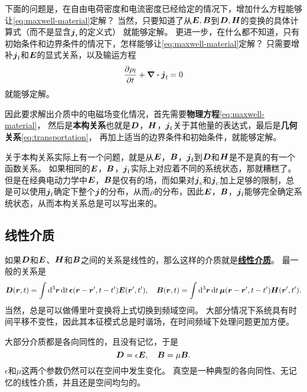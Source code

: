 \documentclass[UTF8, a4paper]{ctexart}
\renewcommand{\emph}[1]{\textbf{#1}}
\newcommand*{\concept}[1]{\underline{\textbf{#1}}}
\begin{document}
下面的问题是，在自由电荷密度和电流密度已经给定的情况下，增加什么方程能够让\eqref{eq:maxwell-material}定解？
当然，只要知道了从$\vb*{E}, \vb*{B}$到$\vb*{D}, \vb*{H}$的变换的具体计算式（而不是显含$\vb*{j}_\text{r}$的定义式）
就能够定解。
更进一步，在什么都不知道，只有初始条件和边界条件的情况下，怎样能够让\eqref{eq:maxwell-material}定解？
只需要增补$\vb*{j}_\text{f}$和$\vb*{E}$的显式关系，以及输运方程
\begin{equation}
    \pdv{\rho_\text{f}}{t} + \div{\vb*{j}_\text{f}} = 0
    \label{eq:transportation}
\end{equation}
就能够定解。

因此要求解出介质中的电磁场变化情况，首先需要\emph{物理方程}\eqref{eq:maxwell-material}，
然后是\emph{本构关系}也就是$\vb*{D}$，$\vb*{H}$，$\vb*{j}_\text{f}$关于其他量的表达式，最后是\emph{几何关系}\eqref{eq:transportation}，
再加上适当的边界条件和初始条件，就能够定解。

关于本构关系实际上有一个问题，就是从$\vb*{E}$，$\vb*{B}$，$\vb*{j}_\text{f}$到$\vb*{D}$和$\vb*{H}$是不是真的有一个函数关系。
如果相同的$\vb*{E}$，$\vb*{B}$，$\vb*{j}_\text{f}$实际上对应着不同的系统状态，那就糟糕了。
但是在经典电动力学中$\vb*{E}$，$\vb*{B}$是仅有的场，而如果对$\vb*{j}_\text{s}$和$\vb*{j}_\text{c}$加上足够的限制，总是可以使用$\vb*{j}_\text{f}$确定下整个$\vb*{j}$的分布，从而$\rho$的分布，因此$\vb*{E}$，$\vb*{B}$，$\vb*{j}_\text{f}$能够完全确定系统状态，从而本构关系总是可以写出来的。

\subsection{线性介质}

如果$\vb*{D}$和$\vb*{E}$、$\vb*{H}$和$\vb*{B}$之间的关系是线性的，那么这样的介质就是\concept{线性介质}。
最一般的关系是
\begin{equation}
    \vb*{D}(\vb*{r}, t) = \int \dd[3]{\vb*{r}} \dd{t} \vb*{\epsilon}(\vb*{r} - \vb*{r}', t - t') \vb*{E}(\vb*{r}', t'), \quad
    \vb*{B}(\vb*{r}, t) = \int \dd[3]{\vb*{r}} \dd{t} \vb*{\mu}(\vb*{r} - \vb*{r}', t - t') \vb*{H}(\vb*{r}', t').
\end{equation}
当然，总是可以做傅里叶变换将上式切换到频域空间。
大部分情况下系统具有时间平移不变性，因此其本征模式总是时谐场，在时间频域下处理问题更加方便。

大部分介质都是各向同性的，且没有记忆，于是
\begin{equation}
    \vb*{D} = \epsilon \vb*{E}, \quad \vb*{B} = \mu \vb*{B}.
\end{equation}
$\epsilon$和$\mu$这两个参数仍然可以在空间中发生变化。
真空是一种典型的各向同性、无记忆的线性介质，并且还是空间均匀的。
\end{document}
